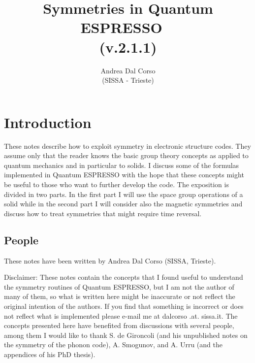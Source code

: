 \documentclass[12pt,a4paper,twoside]{report}
\def\version{2.1.1}
\begin{document}
\author{Andrea Dal Corso \\ (SISSA - Trieste)}
\date{}

\title{
  \vspace{3truecm}
  \Huge \color{dark-blue} Symmetries in Quantum ESPRESSO \ \\
   (v.\version)
}

\maketitle

\newpage

\tableofcontents

\newpage

\newpage
{\color{dark-blue}\chapter{Introduction}}
These notes describe how to exploit symmetry in electronic structure codes. They assume only that the reader knows the basic group theory concepts as applied to quantum mechanics and in particular to solids. I discuss some of the formulas implemented in Quantum ESPRESSO with the hope that these concepts might be useful to those who want to further develop the code. The exposition is divided in two parts. In the first part I will use the space group operations of a solid while in the second part I will consider also the magnetic symmetries and discuss how to treat symmetries that might require time reversal. 


\newpage
\section{People}
These notes have been written by Andrea Dal Corso (SISSA, Trieste). 

Disclaimer: These notes contain the concepts that I found useful to understand the symmetry routines of Quantum ESPRESSO, but I am not the author of many of them, so what is written here might be inaccurate or not reflect the original intention of the authors. If you find that something is incorrect or does not reflect what is implemented please e-mail me at dalcorso .at. sissa.it. 
The concepts presented here have benefited from discussions with several people, among them I would like to thank S. de Gironcoli (and his unpublished notes on the symmetry of the phonon code), A. Smogunov, and A. Urru (and the appendices of his PhD thesis). 
\end{document}
